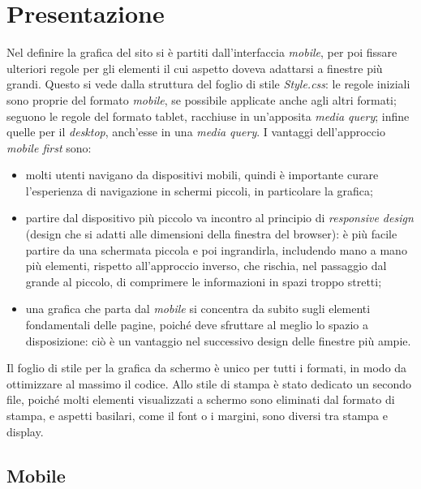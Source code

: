 \section{Presentazione}
\label{presentazione}
Nel definire la grafica del sito si è partiti dall'interfaccia \textit{mobile}, per poi fissare ulteriori regole per gli elementi il cui aspetto doveva adattarsi a finestre più grandi. Questo si vede dalla struttura del foglio di stile \textit{Style.css}: le regole iniziali sono proprie del formato \textit{mobile}, se possibile applicate anche agli altri formati; seguono le regole del formato tablet, racchiuse in un'apposita \textit{media query}; infine quelle per il \textit{desktop}, anch'esse in una \textit{media query}. I vantaggi dell'approccio \textit{mobile first} sono:
\begin{itemize}
	\item molti utenti navigano da dispositivi mobili, quindi è importante curare l'esperienza di navigazione in schermi piccoli, in particolare la grafica;
	\item partire dal dispositivo più piccolo va incontro al principio di \textit{responsive design} (design che si adatti alle dimensioni della finestra del browser): è più facile partire da una schermata piccola e poi ingrandirla, includendo mano a mano più elementi, rispetto all'approccio inverso, che rischia, nel passaggio dal grande al piccolo,  di comprimere le informazioni in spazi troppo stretti;
	\item una grafica che parta dal \textit{mobile} si concentra da subito sugli elementi fondamentali delle pagine, poiché deve sfruttare al meglio lo spazio a disposizione: ciò è un vantaggio nel successivo design delle finestre più ampie.
\end{itemize}
Il foglio di stile per la grafica da schermo è unico per tutti i formati, in modo da ottimizzare al massimo il codice. Allo stile di stampa è stato dedicato un secondo file, poiché molti elementi visualizzati a schermo sono eliminati dal formato di stampa, e aspetti basilari, come il font o i margini, sono diversi tra stampa e display.

\subsection{Mobile}
\label{presentazione-mobile}

